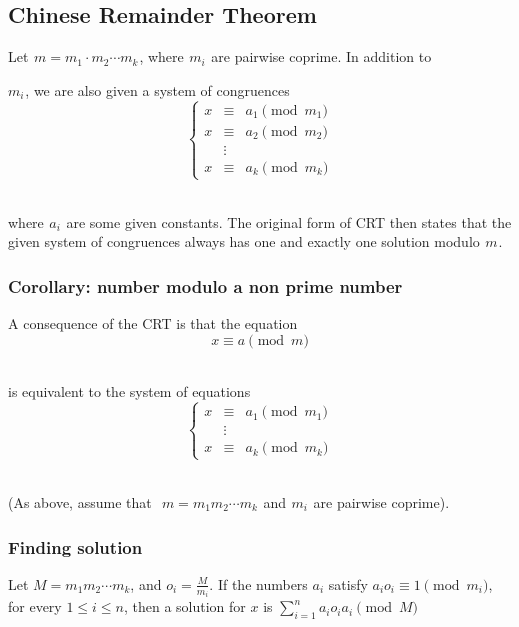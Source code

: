 \subsection{Chinese Remainder Theorem}
Let  $m = m_1 \cdot m_2 \cdots m_k$ , where  $m_i$  are pairwise coprime. In addition to  

$m_i$ , we are also given a system of congruences
 
$$
\left\{\begin{array}{rcl}
        x & \equiv & a_1 \pmod{m_1} \\
        x & \equiv & a_2 \pmod{m_2} \\ 
        & \vdots & \\
        x & \equiv & a_k \pmod{m_k}
\end{array}\right.
$$ 

where  $a_i$  are some given constants. The original form of CRT then states that the given system of congruences always has one and exactly one solution modulo  $m$ .

\subsubsection{Corollary: number modulo a non prime number}

A consequence of the CRT is that the equation
 
$$x \equiv a \pmod{m}$$ 

is equivalent to the system of equations
 
$$\left\{\begin{array}{rcl} x & \equiv & a_1 \pmod{m_1} \\ & \vdots & \\ x & \equiv & a_k \pmod{m_k} \end{array}\right.$$ 

(As above, assume that  
$m = m_1 m_2 \cdots m_k$  and  $m_i$  are pairwise coprime).

\subsubsection{Finding solution}

Let $M = m_{1}m_{2} \cdots m_{k}$, and $o_{i} = \frac{M}{m_{i}}$. If the numbers $a_{i}$ satisfy $a_{i}o_{i} \equiv 1 \pmod {m_{i}}$, for every $1 \leq i \leq n$, then a solution for $x$ is $\sum_{i=1}^n a_{i}o_{i}a_{i} \pmod M$
